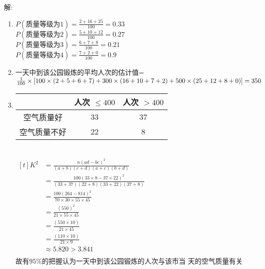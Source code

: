 \documentclass[class=ctexart,crop=false]{standalone}
\begin{document}
解:
\begin{enumerate}[label=(\arabic*)]
    \item 
   $ P( \text{质量等级为}1)=\frac{2+16+25}{100}=0.33 $\\
   $ P( \text{质量等级为}2)=\frac{5+10+12}{100}=0.27 $\\
   $ P( \text{质量等级为}3)=\frac{6+7+8}{100}=0.21 $\\
   $ P( \text{质量等级为}4)=\frac{7+2+0}{100}=0.9 $\\
    \item 一天中到该公园锻炼的平均人次的估计值= \\
    $\frac{1}{100}\times[100\times(2+5+6+7)+300\times(16+10+7+2)+500\times(25+12+8+0)]\\
    =350$
    \item \begin{tabular}{|c|c|c|}
        \hline
            &人次 $\leqslant 400 $ &人次 $> 400 $\\
            \hline
        空气质量好 & 33 & 37 \\
        \hline
        空气质量不好 & 22& 8\\
        \hline
    \end{tabular} \\
    $\begin{aligned}[t]
        K^2&=\frac{n(ad-bc)^2}{(a+b)(c+d)(a+c)(b+d)}\\
        &=\frac{100(33\times 8-37 \times 22)^2}{(33+37)(22+8)(33+22)(37+8)}\\
        &=\frac{100(264-814)^2}{70\times 30\times 55\times 45}\\
        &=\frac{(550)^2}{21\times 55\times 45}\\
        &=\frac{(550\times 10)}{21\times 45}\\
        &=\frac{(110\times 10)}{21\times 9}\\
        &\approx 5.820 > 3.841\\
    \end{aligned}$\\
    故有$95\%$的把握认为一天中到该公园锻炼的人次与该市当
    天的空气质量有关
\end{enumerate}
\end{document}
